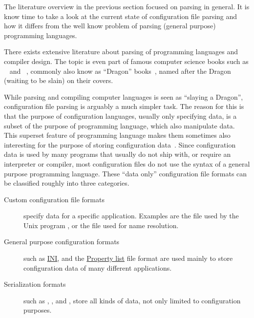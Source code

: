 The literature overview in the previous section focused on parsing in general. It is know time to take a look at the current state of configuration file parsing and how it differs from the well know problem of parsing (general purpose) programming languages.

There exists extensive literature about parsing of programming languages and compiler design. The topic is even part of famous computer science books such as ~\cite{ullman1977principles} and ~\cite{aho2006compilers}, commonly also know as “Dragon” books~\cite{parr2009language}, named after the Dragon (waiting to be slain) on their covers.

While parsing and compiling computer languages is seen as “slaying a Dragon”, configuration file parsing is arguably a much simpler task. The reason for this is that the purpose of configuration languages, usually only specifying data, is a subset of the purpose of programming language, which also manipulate data. This superset feature of programming language makes them sometimes also interesting for the purpose of storing configuration data~\cite{balmer2013lua}. Since configuration data is used by many programs that usually do not ship with, or require an interpreter or compiler, most configuration files do not use the syntax of a general purpose programming language. These “data only” configuration file formats can be classified roughly into three categories.

\begin{description}
  \item[Custom configuration file formats] specify data for a specific application. Examples are the \href{https://en.wikipedia.org/wiki/Fstab}{} file used by the Unix program , or the \href{https://en.wikipedia.org/wiki/https://en.wikipedia.org/wiki/Hosts_file}{} file used for name resolution.

  \item[General purpose configuration formats] such as \href{https://en.wikipedia.org/wiki/INI_file}{INI}, and the \href{https://en.wikipedia.org/wiki/Property_list}{Property list} file format are used mainly to store configuration data of many different applications.

  \item[Serialization formats] such as , , and , store all kinds of data, not only limited to configuration purposes.
\end{description}

